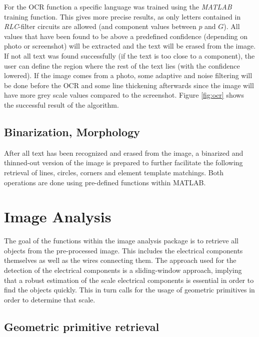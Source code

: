 \documentclass[10pt,twocolumn,letterpaper]{article}
\begin{document}
For the OCR function a specific language was trained using the \textit{MATLAB} training function. This gives more precise results, as only letters contained in \textit{RLC}-filter circuits are allowed (and component values between $p$ and $G$). All values that have been found to be above a predefined confidence (depending on photo or screenshot) will be extracted and the text will be erased from the image. If not all text was found successfully (if the text is too close to a component), the user can define the region where the rest of the text lies (with the confidence lowered). If the image comes from a photo, some adaptive and noise filtering will be done before the OCR and some line thickening afterwards since the image will have more grey scale values compared to the screenshot. Figure \ref{fig:ocr} shows the successful result of the algorithm.

\subsection{Binarization, Morphology}
\label{subsec:morph}

After all text has been recognized and erased from the image, a binarized and thinned-out version of the image is prepared to further facilitate the following retrieval of lines, circles, corners and element template matchings. Both operations are done using pre-defined functions within MATLAB.
\par


\section{Image Analysis}
\label{sec:analysis}

The goal of the functions within the image analysis package is to retrieve all objects from the pre-processed image. This includes the electrical components themselves as well as the wires connecting them. The approach used for the detection of the electrical components is a sliding-window approach, implying that a robust estimation of the scale electrical components is essential in order to find the objects quickly. This in turn calls for the usage of geometric primitives in order to determine that scale.

\subsection{Geometric primitive retrieval}
\label{subsec:geom}
\end{document}
